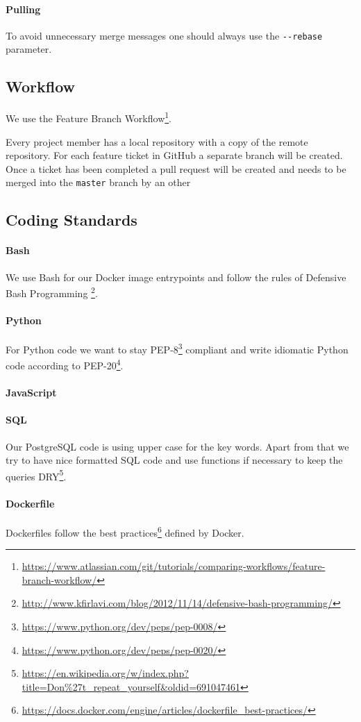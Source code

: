\paragraph{Pulling}
To avoid unnecessary merge messages one should always use the
\texttt{-\/-rebase} parameter.

\subsection{Workflow}\label{workflow}
We use the Feature Branch Workflow\footnote{\url{https://www.atlassian.com/git/tutorials/comparing-workflows/feature-branch-workflow/}}.

Every project member has a local repository with a copy of the remote
repository. For each feature ticket in GitHub a separate branch
will be created. Once a ticket has been completed a pull request will be
created and needs to be merged into the \texttt{master} branch by an other 

\subsection{Coding Standards}

\paragraph{Bash} We use Bash for our Docker image entrypoints and follow
the rules of Defensive Bash Programming \footnote{\url{http://www.kfirlavi.com/blog/2012/11/14/defensive-bash-programming/}}.

\paragraph{Python} For Python code we want to stay PEP-8\footnote{\url{https://www.python.org/dev/peps/pep-0008/}} compliant and write idiomatic Python code according to PEP-20\footnote{\url{https://www.python.org/dev/peps/pep-0020/}}.

\paragraph{JavaScript}


\paragraph{SQL} Our PostgreSQL code is using upper case for the key words. Apart from that we try to have nice formatted SQL code and use functions
if necessary to keep the queries DRY\footnote{\url{https://en.wikipedia.org/w/index.php?title=Don%27t_repeat_yourself&oldid=691047461}}.

\paragraph{Dockerfile} Dockerfiles follow the best practices\footnote{\url{https://docs.docker.com/engine/articles/dockerfile\_best-practices/}} defined by Docker.

